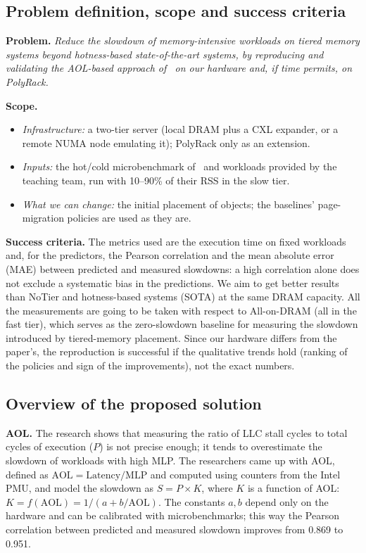 \documentclass[conference]{IEEEtran}
\begin{document}
\subsection{Problem definition, scope and success criteria}
\textbf{Problem.} \emph{Reduce the slowdown of memory-intensive workloads on
tiered memory systems beyond hotness-based state-of-the-art systems, by
reproducing and validating the AOL-based approach of~\cite{liu2025tiered} on
our hardware and, if time permits, on PolyRack.}

\textbf{Scope.}
\begin{itemize}
  \item \emph{Infrastructure:} a two-tier server (local DRAM plus a CXL
        expander, or a remote NUMA node emulating it); PolyRack only as an
        extension.
  \item \emph{Inputs:} the hot/cold microbenchmark of~\cite{liu2025tiered}
        and workloads provided by the teaching team, run with
        10--90\% of their RSS in the slow tier.
  \item \emph{What we can change:} the initial placement
        of objects; the baselines' page-migration policies are used as they
        are.
\end{itemize}

\textbf{Success criteria.} 
The metrics used are the execution time on fixed workloads and, for the predictors, the Pearson correlation and the mean absolute error (MAE) between predicted and measured slowdowns: a high correlation alone does not exclude a systematic bias in the predictions.
We aim to get better results than NoTier and hotness-based systems (SOTA) at the same DRAM capacity.
All the measurements are going to be taken with respect to All-on-DRAM (all in the fast tier), which serves as the zero-slowdown baseline for measuring the slowdown introduced by tiered-memory placement.
Since our hardware
differs from the paper’s, the reproduction is successful if the
qualitative trends hold (ranking of the policies and sign of the
improvements), not the exact numbers.

\subsection{Overview of the proposed solution~\cite{liu2025tiered}}
\textbf{AOL.} 
The research shows that measuring the ratio of LLC stall cycles to total cycles of execution ($P$) is not precise enough; it tends to overestimate
the slowdown of workloads with high MLP.
The researchers came up with AOL, defined as $\text{AOL} = \text{Latency}/\text{MLP}$ and computed using counters from the Intel PMU, and model the slowdown as $S = P \times K$, where $K$ is a function of AOL:
$K = f(\text{AOL}) = 1/(a + b/\text{AOL})$. The constants $a,b$ depend only on the hardware and can
be calibrated with microbenchmarks; this way the Pearson correlation between predicted
and measured slowdown improves from 0.869 to 0.951.
\end{document}
